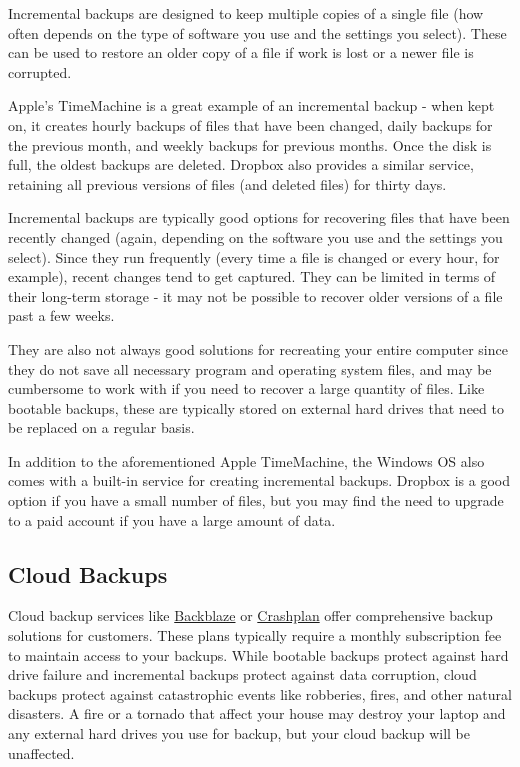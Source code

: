 \documentclass[]{book}
\begin{document}
Incremental backups are designed to keep multiple copies of a single
file (how often depends on the type of software you use and the settings
you select). These can be used to restore an older copy of a file if
work is lost or a newer file is corrupted.

Apple's TimeMachine is a great example of an incremental backup - when
kept on, it creates hourly backups of files that have been changed,
daily backups for the previous month, and weekly backups for previous
months. Once the disk is full, the oldest backups are deleted. Dropbox
also provides a similar service, retaining all previous versions of
files (and deleted files) for thirty days.

Incremental backups are typically good options for recovering files that
have been recently changed (again, depending on the software you use and
the settings you select). Since they run frequently (every time a file
is changed or every hour, for example), recent changes tend to get
captured. They can be limited in terms of their long-term storage - it
may not be possible to recover older versions of a file past a few
weeks.

They are also not always good solutions for recreating your entire
computer since they do not save all necessary program and operating
system files, and may be cumbersome to work with if you need to recover
a large quantity of files. Like bootable backups, these are typically
stored on external hard drives that need to be replaced on a regular
basis.

In addition to the aforementioned Apple TimeMachine, the Windows OS also
comes with a built-in service for creating incremental backups. Dropbox
is a good option if you have a small number of files, but you may find
the need to upgrade to a paid account if you have a large amount of
data.

\subsection{Cloud Backups}\label{cloud-backups}

Cloud backup services like \href{https://www.backblaze.com}{Backblaze}
or \href{https://www.code42.com/crashplan/}{Crashplan} offer
comprehensive backup solutions for customers. These plans typically
require a monthly subscription fee to maintain access to your backups.
While bootable backups protect against hard drive failure and
incremental backups protect against data corruption, cloud backups
protect against catastrophic events like robberies, fires, and other
natural disasters. A fire or a tornado that affect your house may
destroy your laptop and any external hard drives you use for backup, but
your cloud backup will be unaffected.
\end{document}

